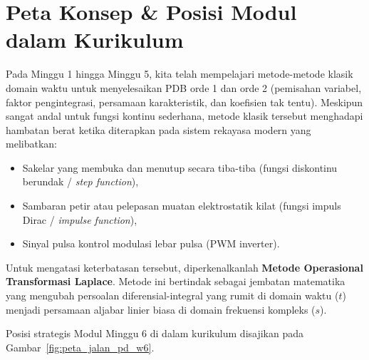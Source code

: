 \documentclass[11pt,a4paper]{article}
\theoremstyle{definition}
\begin{document}
\section{Peta Konsep \& Posisi Modul dalam Kurikulum}

Pada Minggu 1 hingga Minggu 5, kita telah mempelajari metode-metode klasik domain waktu untuk menyelesaikan PDB orde 1 dan orde 2 (pemisahan variabel, faktor pengintegrasi, persamaan karakteristik, dan koefisien tak tentu). Meskipun sangat andal untuk fungsi kontinu sederhana, metode klasik tersebut menghadapi hambatan berat ketika diterapkan pada sistem rekayasa modern yang melibatkan:
\begin{itemize}[leftmargin=*]
    \item Sakelar yang membuka dan menutup secara tiba-tiba (fungsi diskontinu berundak / \textit{step function}),
    \item Sambaran petir atau pelepasan muatan elektrostatik kilat (fungsi impuls Dirac / \textit{impulse function}),
    \item Sinyal pulsa kontrol modulasi lebar pulsa (PWM inverter).
\end{itemize}

Untuk mengatasi keterbatasan tersebut, diperkenalkanlah \textbf{Metode Operasional Transformasi Laplace}. Metode ini bertindak sebagai jembatan matematika yang mengubah persoalan diferensial-integral yang rumit di domain waktu ($t$) menjadi persamaan aljabar linier biasa di domain frekuensi kompleks ($s$).

Posisi strategis Modul Minggu 6 di dalam kurikulum disajikan pada Gambar~\ref{fig:peta_jalan_pd_w6}.
\end{document}
